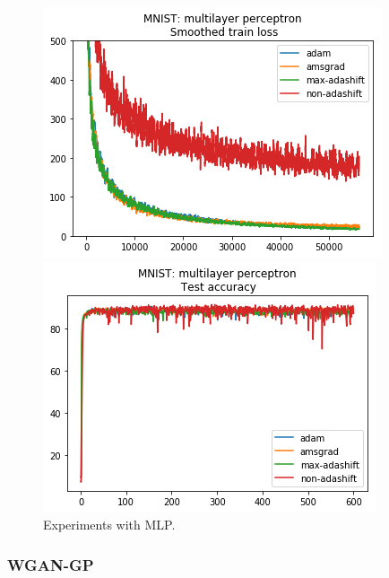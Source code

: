 \documentclass{article} %
\begin{document}
\begin{figure}[t]
\centering
\begin{minipage}{.5\linewidth}
\includegraphics[width=.99\linewidth]{mnist_mlp.png}
\end{minipage}\hfill
\begin{minipage}{.5\linewidth}
\includegraphics[width=.99\linewidth]{mlp_test_acc_mnist.png}
\end{minipage}
\caption{Experiments with MLP.}\label{fig:mnist:mlp}
\end{figure}

\subsubsection{WGAN-GP}
\end{document}
